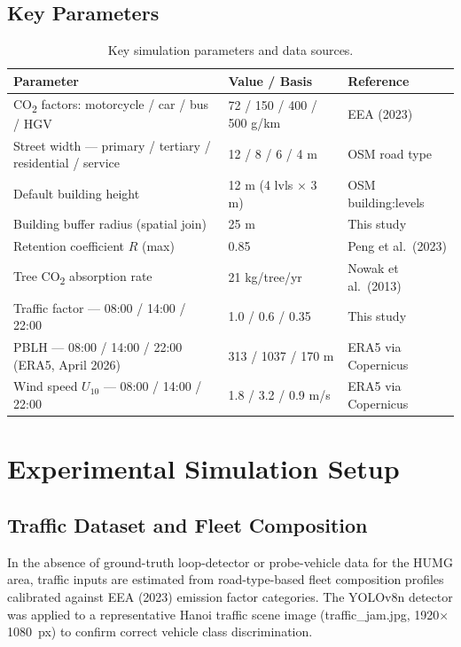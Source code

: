 \documentclass[12pt,a4paper]{article}
\begin{document}
\subsection{Key Parameters}

\begin{table}[H]
\centering
\caption{Key simulation parameters and data sources.}
\label{tab:params}
\small\begin{tabularx}{\textwidth}{L{5.7cm} L{4.8cm} L{3.3cm}}
\toprule
\textbf{Parameter} & \textbf{Value / Basis} & \textbf{Reference} \\
\midrule
CO\textsubscript{2} factors: motorcycle / car / bus / HGV & 72 / 150 / 400 / 500 g/km & EEA (2023) \\
Street width --- primary / tertiary / residential / service & 12 / 8 / 6 / 4 m & OSM road type \\
Default building height & 12 m (4 lvls $\times$ 3 m) & OSM building:levels \\
Building buffer radius (spatial join) & 25 m & This study \\
Retention coefficient $R$ (max) & 0.85 & Peng et al.\ (2023) \\
Tree CO\textsubscript{2} absorption rate & 21 kg/tree/yr & Nowak et al.\ (2013) \\
Traffic factor --- 08:00 / 14:00 / 22:00 & 1.0 / 0.6 / 0.35 & This study \\
PBLH --- 08:00 / 14:00 / 22:00 (ERA5, April 2026) & 313 / 1037 / 170 m & ERA5 via Copernicus \\
Wind speed $U_{10}$ --- 08:00 / 14:00 / 22:00 & 1.8 / 3.2 / 0.9 m/s & ERA5 via Copernicus \\
\bottomrule
\end{tabularx}
\end{table}

\section{Experimental Simulation Setup}

\subsection{Traffic Dataset and Fleet Composition}

In the absence of ground-truth loop-detector or probe-vehicle data for the HUMG area, traffic inputs are estimated from road-type-based fleet composition profiles calibrated against EEA (2023) emission factor categories. The YOLOv8n detector was applied to a representative Hanoi traffic scene image (traffic\_jam.jpg, 1920$\times$1080~px) to confirm correct vehicle class discrimination.
\end{document}
